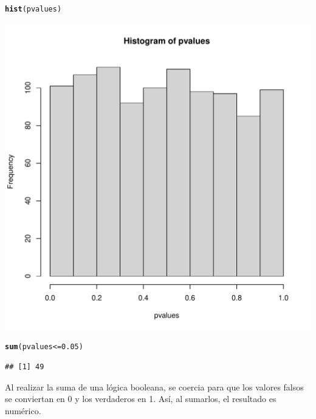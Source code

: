 \documentclass{config/apuntes}\usepackage[]{graphicx}\usepackage[]{xcolor}
\makeatletter
\def\maxwidth{ %
  \ifdim\Gin@nat@width>\linewidth
    \linewidth
  \else
    \Gin@nat@width
  \fi
}
\newcommand{\hlnum}[1]{\textcolor[rgb]{0.686,0.059,0.569}{#1}}%
\newcommand{\hlopt}[1]{\textcolor[rgb]{0,0,0}{#1}}%
\newcommand{\hldef}[1]{\textcolor[rgb]{0.345,0.345,0.345}{#1}}%
\newcommand{\hlkwd}[1]{\textcolor[rgb]{0.737,0.353,0.396}{\textbf{#1}}}%
\newenvironment{kframe}{%
 \def\at@end@of@kframe{}%
 \ifinner\ifhmode%
  \def\at@end@of@kframe{\end{minipage}}%
  \begin{minipage}{\columnwidth}%
 \fi\fi%
 \def\FrameCommand##1{\hskip\@totalleftmargin \hskip-\fboxsep
 \colorbox{shadecolor}{##1}\hskip-\fboxsep
     \hskip-\linewidth \hskip-\@totalleftmargin \hskip\columnwidth}%
 \MakeFramed {\advance\hsize-\width
   \@totalleftmargin\z@ \linewidth\hsize
   \@setminipage}}%
 {\par\unskip\endMakeFramed%
 \at@end@of@kframe}
\newenvironment{knitrout}{}{} %
\makeatother
\begin{document}
\begin{knitrout}
\color{fgcolor}\begin{kframe}
\begin{alltt}
\hlkwd{hist}\hldef{(pvalues)}
\end{alltt}
\end{kframe}
\includegraphics[width=\maxwidth]{figure/unnamed-chunk-7-1} 
\begin{kframe}\begin{alltt}
\hlkwd{sum}\hldef{(pvalues} \hlopt{<=} \hlnum{0.05}\hldef{)}
\end{alltt}
\begin{verbatim}
## [1] 49
\end{verbatim}
\end{kframe}
\end{knitrout}

Al realizar la suma de una lógica booleana, se coercia para que los valores falsos se conviertan en 0 y los verdaderos en 1. Así, al sumarlos, el resultado es numérico. 
\end{document}
